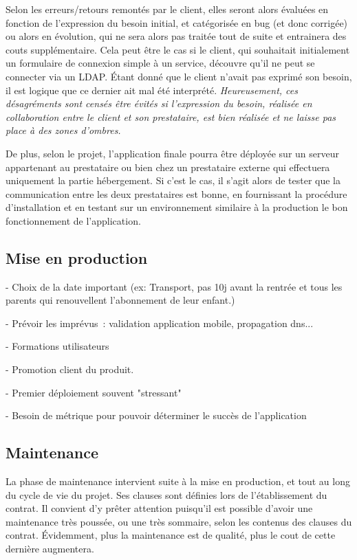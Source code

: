 Selon les erreurs/retours remontés par le client, elles seront alors évaluées en fonction de l'expression du besoin initial, et catégorisée en bug (et donc corrigée) ou alors en évolution, qui ne sera alors pas traitée tout de suite et entrainera des couts supplémentaire. Cela peut être le cas si le client, qui souhaitait initialement un formulaire de connexion simple à un service, découvre qu'il ne peut se connecter via un \gls{LDAP}. Étant donné que le client n'avait pas exprimé son besoin, il est logique que ce dernier ait mal été interprété. \emph{Heureusement, ces désagréments sont censés être évités si l'expression du besoin, réalisée en collaboration entre le client et son prestataire, est bien réalisée et ne laisse pas place à des zones d'ombres.}

De plus, selon le projet, l'application finale pourra être déployée sur un serveur appartenant au prestataire ou bien chez un prestataire externe qui effectuera uniquement la partie hébergement. Si c'est le cas, il s'agit alors de tester que la communication entre les deux prestataires est bonne, en fournissant la procédure d'installation et en testant sur un environnement similaire à la production le bon fonctionnement de l'application.

\subsection{Mise en production}

- Choix de la date important (ex: Transport, pas 10j avant la rentrée et tous les parents qui renouvellent l'abonnement de leur enfant.)

- Prévoir les imprévus : validation application mobile, propagation dns...

- Formations utilisateurs

- Promotion client du produit.

- Premier déploiement souvent "stressant"

- Besoin de métrique pour pouvoir déterminer le succès de l'application


\subsection{Maintenance}

La phase de maintenance intervient suite à la mise en production, et tout au long du cycle de vie du projet. Ses clauses sont définies lors de l'établissement du contrat. Il convient d'y prêter attention puisqu'il est possible d'avoir une maintenance très poussée, ou une très sommaire, selon les contenus des clauses du contrat. Évidemment, plus la maintenance est de qualité, plus le cout de cette dernière augmentera.

